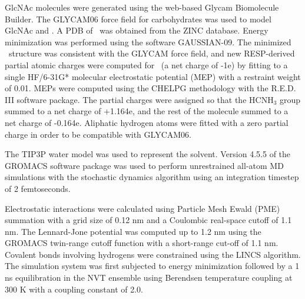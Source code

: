 GlcNAc molecules were generated using the web-based Glycam Biomolecule Builder.\cite{Woods:glycambuilder} The GLYCAM06 force field for carbohydrates\cite{Kirschner:2008ii} was used to model GlcNAc and \glucosamine. A PDB of \glucosamine\ was obtained from the ZINC database.\cite{Irwin:2005kx} Energy minimization was performed using the software GAUSSIAN-09.\cite{g09} The minimized \glucosamine\ structure was consistent with the GLYCAM force field, and new RESP-derived partial atomic charges were computed for \glucosamine\ (a net charge of -1e) by fitting to a single HF/6-31G* molecular electrostatic potential (MEP) with a restraint weight of 0.01. MEPs were computed using the CHELPG methodology\cite{Breneman:1990ue} with the R.E.D. III software package.\cite{Dupradeau:2010bb} The partial charges were assigned so that the HCNH$_{3}$ group summed to a net charge of +1.164e, and the rest of the molecule summed to a net charge of -0.164e. Aliphatic hydrogen atoms were fitted with a zero partial charge in order to be compatible with GLYCAM06.


The TIP3P water model was used to represent the solvent. Version 4.5.5 of the GROMACS software package\cite{Pronk:2013ef,Hess:2008p5353} was used to perform unrestrained all-atom MD simulations with the stochastic dynamics algorithm using an integration timestep of 2 femtoseconds.

Electrostatic interactions were calculated using Particle Mesh Ewald (PME) summation with a grid size of 0.12 nm and a Coulombic real-space cutoff of 1.1 nm. The Lennard-Jone potential was computed up to 1.2 nm using the GROMACS twin-range cutoff function with a short-range cut-off of 1.1 nm. Covalent bonds involving hydrogens were constrained using the LINCS algorithm. The simulation system was first subjected to energy minimization followed by a 1 ns equilibration in the NVT ensemble using Berendsen temperature coupling at 300 K with a coupling constant of 2.0.

